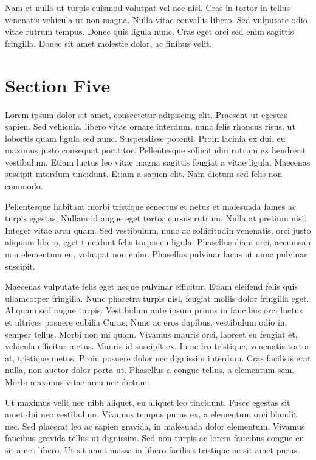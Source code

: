 \documentclass[runningheads,a4paper]{llncs}
\begin{document}
Nam et nulla ut turpis euismod volutpat vel nec nisl. Cras in tortor in tellus venenatis vehicula ut non magna. Nulla vitae convallis libero. Sed vulputate odio vitae rutrum tempus. Donec quis ligula nunc. Cras eget orci sed enim sagittis fringilla. Donec sit amet molestie dolor, ac finibus velit.
%
\newpage
%
\section{Section Five}
%
Lorem ipsum dolor sit amet, consectetur adipiscing elit. Praesent ut egestas sapien. Sed vehicula, libero vitae ornare interdum, nunc felis rhoncus risus, ut lobortis quam ligula sed nunc. Suspendisse potenti. Proin lacinia ex dui, eu maximus justo consequat porttitor. Pellentesque sollicitudin rutrum ex hendrerit vestibulum. Etiam luctus leo vitae magna sagittis feugiat a vitae ligula. Maecenas suscipit interdum tincidunt. Etiam a sapien elit. Nam dictum sed felis non commodo.

Pellentesque habitant morbi tristique senectus et netus et malesuada fames ac turpis egestas. Nullam id augue eget tortor cursus rutrum. Nulla at pretium nisi. Integer vitae arcu quam. Sed vestibulum, nunc ac sollicitudin venenatis, orci justo aliquam libero, eget tincidunt felis turpis eu ligula. Phasellus diam orci, accumsan non elementum eu, volutpat non enim. Phasellus pulvinar lacus ut nunc pulvinar suscipit.

Maecenas vulputate felis eget neque pulvinar efficitur. Etiam eleifend felis quis ullamcorper fringilla. Nunc pharetra turpis nisl, feugiat mollis dolor fringilla eget. Aliquam sed augue turpis. Vestibulum ante ipsum primis in faucibus orci luctus et ultrices posuere cubilia Curae; Nunc ac eros dapibus, vestibulum odio in, semper tellus. Morbi non mi quam. Vivamus mauris orci, laoreet eu feugiat et, vehicula efficitur metus. Mauris id suscipit ex. In ac leo tristique, venenatis tortor at, tristique metus. Proin posuere dolor nec dignissim interdum. Cras facilisis erat nulla, non auctor dolor porta ut. Phasellus a congue tellus, a elementum sem. Morbi maximus vitae arcu nec dictum.

Ut maximus velit nec nibh aliquet, eu aliquet leo tincidunt. Fusce egestas sit amet dui nec vestibulum. Vivamus tempus purus ex, a elementum orci blandit nec. Sed placerat leo ac sapien gravida, in malesuada dolor elementum. Vivamus faucibus gravida tellus ut dignissim. Sed non turpis ac lorem faucibus congue eu sit amet libero. Ut sit amet massa in libero facilisis tristique ac sit amet purus.
\end{document}
